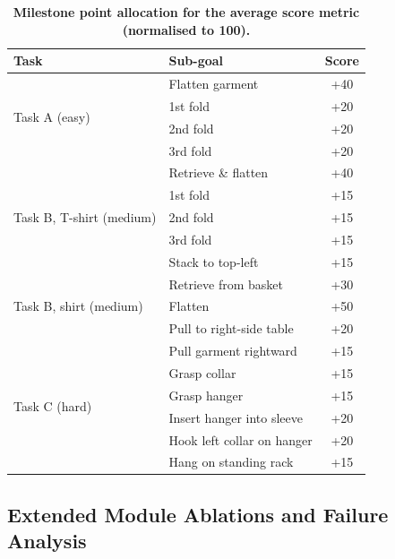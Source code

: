 \begin{table}[tb]
  \centering
  \caption[Milestone point allocation for the average score metric (normalised to 100)]{\textbf{Milestone point allocation for the average score metric (normalised to 100).}}
  \label{kai0:tab:score}
  \begin{tabular}{llc}
    \toprule
    \textbf{Task} & \textbf{Sub-goal} & \textbf{Score} \\
    \midrule
    \multirow{4}{*}{Task A (easy)}
      & Flatten garment & +40 \\
      & 1st fold & +20 \\
      & 2nd fold & +20 \\
      & 3rd fold & +20 \\
    \midrule
    \multirow{5}{*}{Task B, T-shirt (medium)}
      & Retrieve \& flatten & +40 \\
      & 1st fold & +15 \\
      & 2nd fold & +15 \\
      & 3rd fold & +15 \\
      & Stack to top-left & +15 \\
    \midrule
    \multirow{3}{*}{Task B, shirt (medium)}
      & Retrieve from basket & +30 \\
      & Flatten & +50 \\
      & Pull to right-side table & +20 \\
    \midrule
    \multirow{6}{*}{Task C (hard)}
      & Pull garment rightward & +15 \\
      & Grasp collar & +15 \\
      & Grasp hanger & +15 \\
      & Insert hanger into sleeve & +20 \\
      & Hook left collar on hanger & +20 \\
      & Hang on standing rack & +15 \\
    \bottomrule
  \end{tabular}
\end{table}

\subsection{Extended Module Ablations and Failure Analysis}\label{kai0:app:license}\label{kai0:app:ablation}\label{kai0:app:ablation_ma}\label{kai0:app:ablation_sa}\label{kai0:app:ablation_tda}\label{kai0:app:failure}

